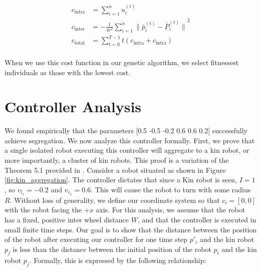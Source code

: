 \documentclass[conference]{IEEEtran}
\begin{document}
  \begin{align*}
  c_{\text{intra}} &= \sum_{i=1}^n u_i^{(t)} \\
  c_{\text{inter}} &= -\frac{1} {4r^2}\sum_{i=1}^n{\lVert \bar{p}_i^{(t)} - \bar{P}_i^{(t)} \rVert}^2 \\
  c_{\text{total}} &=  \sum_{t=0}^{T-1} t (c_{\text{intra}} + c_{\text{intra}}) \\
  \end{align*}

  When we use this cost function in our genetic algorithm, we select fitnessest individuals as those with the lowest cost.


\section{Controller Analysis}

  We found empirically that the parameters [0.5 -0.5 -0.2 0.6 0.6 0.2] successfully achieve segregation. We now analyze this controller formally. First, we prove that a single isolated robot executing this controller will aggregate to a kin robot, or more importantly, a cluster of kin robots. This proof is a variation of the Theorem 5.1 provided in \cite{gauci_self-organized_2014}. Consider a robot situated as shown in Figure \ref{fig:kin_aggregation}. The controller dictates that since a Kin robot is seen, $I=1$, so $v_{l_1} = -0.2$ and $v_{r_1} = 0.6$. This will cause the robot to turn with some radius $R$. Without loss of generality, we define our coordinate system so that $c_i=[0,0]$ with the robot facing the $+x$ axis. For this analysis, we assume that the robot has a fixed, positive inter wheel distance $W$, and that the controller is executed in small finite time steps. Our goal is to show that the distance between the position of the robot after executing our controller for one time step $p'_i$ and the kin robot $p_j$ is less than the distance between the initial position of the robot $p_i$ and the kin robot $p_j$. Formally, this is expressed by the following relationship:
\end{document}
